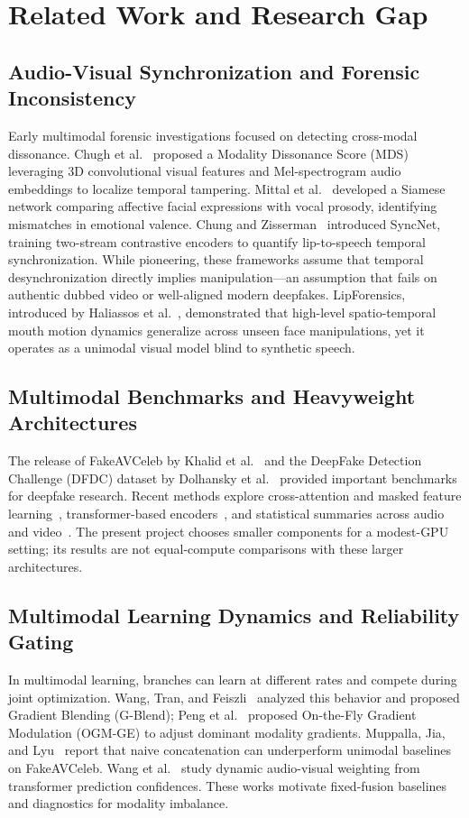 \documentclass[conference]{IEEEtran}
\begin{document}
\section{Related Work and Research Gap}

\subsection{Audio-Visual Synchronization and Forensic Inconsistency}
Early multimodal forensic investigations focused on detecting cross-modal dissonance. Chugh et al.~\cite{chugh2020} proposed a Modality Dissonance Score (MDS) leveraging 3D convolutional visual features and Mel-spectrogram audio embeddings to localize temporal tampering. Mittal et al.~\cite{mittal2020} developed a Siamese network comparing affective facial expressions with vocal prosody, identifying mismatches in emotional valence. Chung and Zisserman~\cite{chung2016} introduced SyncNet, training two-stream contrastive encoders to quantify lip-to-speech temporal synchronization. While pioneering, these frameworks assume that temporal desynchronization directly implies manipulation---an assumption that fails on authentic dubbed video or well-aligned modern deepfakes. LipForensics, introduced by Haliassos et al.~\cite{haliassos2021}, demonstrated that high-level spatio-temporal mouth motion dynamics generalize across unseen face manipulations, yet it operates as a unimodal visual model blind to synthetic speech.

\subsection{Multimodal Benchmarks and Heavyweight Architectures}
The release of FakeAVCeleb by Khalid et al.~\cite{khalid2021} and the DeepFake Detection Challenge (DFDC) dataset by Dolhansky et al.~\cite{dolhansky2020} provided important benchmarks for deepfake research. Recent methods explore cross-attention and masked feature learning~\cite{yang2023,oorloff2024}, transformer-based encoders~\cite{ilyas2023}, and statistical summaries across audio and video~\cite{astrid2024}. The present project chooses smaller components for a modest-GPU setting; its results are not equal-compute comparisons with these larger architectures.

\subsection{Multimodal Learning Dynamics and Reliability Gating}
In multimodal learning, branches can learn at different rates and compete during joint optimization. Wang, Tran, and Feiszli~\cite{wang2020gblend} analyzed this behavior and proposed Gradient Blending (G-Blend); Peng et al.~\cite{peng2022ogm} proposed On-the-Fly Gradient Modulation (OGM-GE) to adjust dominant modality gradients. Muppalla, Jia, and Lyu~\cite{muppalla2023} report that naive concatenation can underperform unimodal baselines on FakeAVCeleb. Wang et al.~\cite{wang2024} study dynamic audio-visual weighting from transformer prediction confidences. These works motivate fixed-fusion baselines and diagnostics for modality imbalance.
\end{document}
